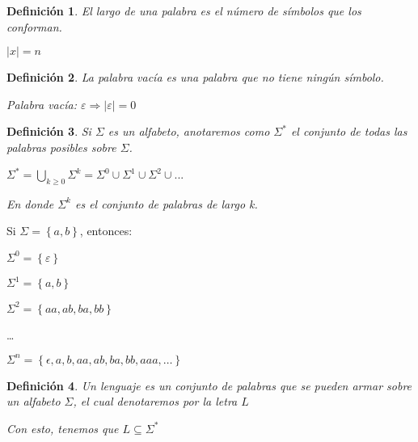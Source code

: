\documentclass[12pt]{article}
\newtheorem{definicion}{Definición}
\begin{document}
\begin{definicion}
  El largo de una palabra es el número de símbolos que los conforman. \par \begin{center}$\left\lvert x \right\rvert  = n$\end{center}
\end{definicion}

\begin{definicion}
  La palabra vacía es una palabra que no tiene ningún símbolo.
  \begin{center}
    Palabra vacía: $\varepsilon \Rightarrow \left\lvert \varepsilon \right\rvert = 0$
  \end{center}
\end{definicion}

\begin{definicion}
  Si $\Sigma$ es un alfabeto, anotaremos como $\Sigma^*$ el conjunto de todas las palabras posibles sobre $\Sigma$.
  \begin{center}
    $\Sigma^* = \bigcup_{k\geq0} \Sigma^k = \Sigma^0 \cup \Sigma^1 \cup \Sigma^2 \cup ...$

    En donde $\Sigma^k$ es el conjunto de palabras de largo k.
  \end{center}
\end{definicion}

\begin{ejemplo}
  \begin{center}
    Si $\Sigma = \left\{a, b\right\} $, entonces: 
  
    $\Sigma^0 = \left\{\varepsilon\right\}$
  
    $\Sigma^1 = \left\{a, b\right\}$
  
    $\Sigma^2 = \left\{aa, ab, ba, bb\right\}$
  
    \dots
    
    $\Sigma^n = \left\{\epsilon, a, b, aa, ab, ba, bb, aaa, \dots\right\}$
  \end{center}
\end{ejemplo}

\begin{definicion}
  Un lenguaje es un conjunto de palabras que se pueden armar sobre un alfabeto $\Sigma$, el cual denotaremos por la letra $L$

  \begin{center}
    Con esto, tenemos que $L\subseteq \Sigma^*$
  \end{center}
\end{definicion}
\end{document}
